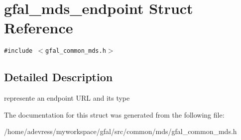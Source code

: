 \section{gfal\_\-mds\_\-endpoint Struct Reference}
\label{structgfal__mds__endpoint}
{\tt \#include $<$gfal\_\-common\_\-mds.h$>$}



\subsection{Detailed Description}
represente an endpoint URL and its type 



The documentation for this struct was generated from the following file:\begin{CompactItemize}
\item 
/home/adevress/myworkspace/gfal/src/common/mds/gfal\_\-common\_\-mds.h\end{CompactItemize}
